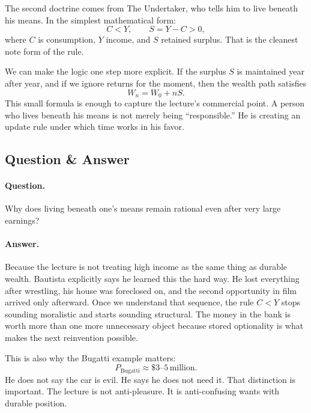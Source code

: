 The second doctrine comes from The Undertaker, who tells him to live beneath his means. In the simplest mathematical form:
\begin{equation}
C<Y,\qquad S=Y-C>0,
\end{equation}
where \(C\) is consumption, \(Y\) income, and \(S\) retained surplus. That is the cleanest note form of the rule.

We can make the logic one step more explicit. If the surplus \(S\) is maintained year after year, and if we ignore returns for the moment, then the wealth path satisfies
\begin{equation}
W_n = W_0 + nS.
\end{equation}
This small formula is enough to capture the lecture's commercial point. A person who lives beneath his means is not merely being ``responsible.'' He is creating an update rule under which time works in his favor.

\subsection{Question \& Answer}

\paragraph{Question.} Why does living beneath one's means remain rational even after very large earnings?

\paragraph{Answer.} Because the lecture is not treating high income as the same thing as durable wealth. Bautista explicitly says he learned this the hard way. He lost everything after wrestling, his house was foreclosed on, and the second opportunity in film arrived only afterward. Once we understand that sequence, the rule \(C<Y\) stops sounding moralistic and starts sounding structural. The money in the bank is worth more than one more unnecessary object because stored optionality is what makes the next reinvention possible.

This is also why the Bugatti example matters:
\begin{equation}
P_{\text{Bugatti}} \approx \$3\text{--}5\,\text{million}.
\end{equation}
He does not say the car is evil. He says he does not need it. That distinction is important. The lecture is not anti-pleasure. It is anti-confusing wants with durable position.

